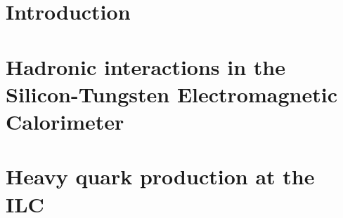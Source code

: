 \documentclass[a4paper, 12pt]{article}
\begin{document}
\linenumbers
\newpage\part{Introduction}\label{PARTI}

\newpage

\newpage

\newpage\part{Hadronic interactions in the Silicon-Tungsten Electromagnetic Calorimeter}\label{PARTII}

\newpage\part{Heavy quark production at the ILC}\label{PARTIII}

\newpage

\newpage


\newpage

\renewcommand\refname{References}



%
{}
%

% 
\end{document}
